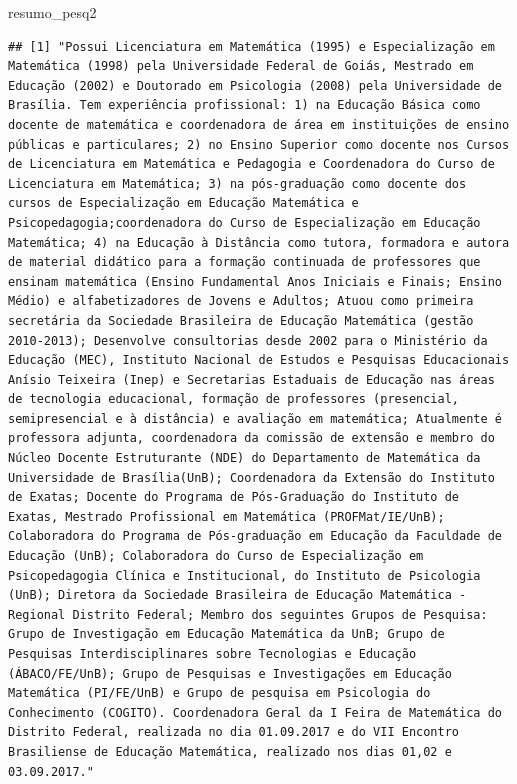 \documentclass[]{article}
\newenvironment{Shaded}{\begin{snugshade}}{\end{snugshade}}
\newcommand{\NormalTok}[1]{#1}
\begin{document}
\begin{Shaded}
\begin{Highlighting}[]
\NormalTok{resumo_pesq2}
\end{Highlighting}
\end{Shaded}

\begin{verbatim}
## [1] "Possui Licenciatura em Matemática (1995) e Especialização em Matemática (1998) pela Universidade Federal de Goiás, Mestrado em Educação (2002) e Doutorado em Psicologia (2008) pela Universidade de Brasília. Tem experiência profissional: 1) na Educação Básica como docente de matemática e coordenadora de área em instituições de ensino públicas e particulares; 2) no Ensino Superior como docente nos Cursos de Licenciatura em Matemática e Pedagogia e Coordenadora do Curso de Licenciatura em Matemática; 3) na pós-graduação como docente dos cursos de Especialização em Educação Matemática e Psicopedagogia;coordenadora do Curso de Especialização em Educação Matemática; 4) na Educação à Distância como tutora, formadora e autora de material didático para a formação continuada de professores que ensinam matemática (Ensino Fundamental Anos Iniciais e Finais; Ensino Médio) e alfabetizadores de Jovens e Adultos; Atuou como primeira secretária da Sociedade Brasileira de Educação Matemática (gestão 2010-2013); Desenvolve consultorias desde 2002 para o Ministério da Educação (MEC), Instituto Nacional de Estudos e Pesquisas Educacionais Anísio Teixeira (Inep) e Secretarias Estaduais de Educação nas áreas de tecnologia educacional, formação de professores (presencial, semipresencial e à distância) e avaliação em matemática; Atualmente é professora adjunta, coordenadora da comissão de extensão e membro do Núcleo Docente Estruturante (NDE) do Departamento de Matemática da Universidade de Brasília(UnB); Coordenadora da Extensão do Instituto de Exatas; Docente do Programa de Pós-Graduação do Instituto de Exatas, Mestrado Profissional em Matemática (PROFMat/IE/UnB); Colaboradora do Programa de Pós-graduação em Educação da Faculdade de Educação (UnB); Colaboradora do Curso de Especialização em Psicopedagogia Clínica e Institucional, do Instituto de Psicologia (UnB); Diretora da Sociedade Brasileira de Educação Matemática - Regional Distrito Federal; Membro dos seguintes Grupos de Pesquisa: Grupo de Investigação em Educação Matemática da UnB; Grupo de Pesquisas Interdisciplinares sobre Tecnologias e Educação (ÁBACO/FE/UnB); Grupo de Pesquisas e Investigações em Educação Matemática (PI/FE/UnB) e Grupo de pesquisa em Psicologia do Conhecimento (COGITO). Coordenadora Geral da I Feira de Matemática do Distrito Federal, realizada no dia 01.09.2017 e do VII Encontro Brasiliense de Educação Matemática, realizado nos dias 01,02 e 03.09.2017."
\end{verbatim}
\end{document}
